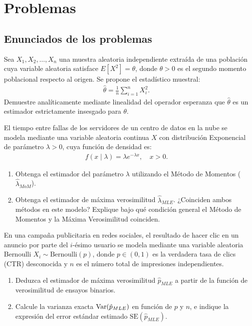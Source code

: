 \section*{Problemas}

\subsection*{Enunciados de los problemas}

\begin{problema}
	\label{prob:1d85679}
	Sea $X_1, X_2, \dots, X_n$ una muestra aleatoria independiente extraída de una población cuya variable aleatoria satisface $E[X^2] = \theta$, donde $\theta > 0$ es el segundo momento poblacional respecto al origen. Se propone el estadístico muestral:
	\begin{align}
		\hat{\theta} = \frac{1}{n} \sum_{i=1}^n X_i^2.
	\end{align}
	Demuestre analíticamente mediante linealidad del operador esperanza que $\hat{\theta}$ es un estimador estrictamente insesgado para $\theta$.
\end{problema}

\begin{problema}
	\label{prob:6f639cf}
	El tiempo entre fallas de los servidores de un centro de datos en la nube se modela mediante una variable aleatoria continua $X$ con distribución Exponencial de parámetro $\lambda > 0$, cuya función de densidad es:
	\begin{align}
		f(x \mid \lambda) = \lambda e^{-\lambda x}, \quad x > 0.
	\end{align}
	\begin{enumerate}
		\item Obtenga el estimador del parámetro $\lambda$ utilizando el Método de Momentos ($\hat{\lambda}_{MoM}$).
		\item Obtenga el estimador de máxima verosimilitud $\hat{\lambda}_{MLE}$. ¿Coinciden ambos métodos en este modelo? Explique bajo qué condición general el Método de Momentos y la Máxima Verosimilitud coinciden.
	\end{enumerate}
\end{problema}

\begin{problema}
	\label{prob:0363afd}
	En una campaña publicitaria en redes sociales, el resultado de hacer clic en un anuncio por parte del $i$-ésimo usuario se modela mediante una variable aleatoria Bernoulli $X_i \sim \text{Bernoulli}(p)$, donde $p \in (0,1)$ es la verdadera tasa de clics (CTR) desconocida y $n$ es el número total de impresiones independientes.
	\begin{enumerate}
		\item Deduzca el estimador de máxima verosimilitud $\hat{p}_{MLE}$ a partir de la función de verosimilitud de ensayos binarios.
		\item Calcule la varianza exacta $\operatorname{Var}(\hat{p}_{MLE})$ en función de $p$ y $n$, e indique la expresión del error estándar estimado $\text{SE}(\hat{p}_{MLE})$.
	\end{enumerate}
\end{problema}

